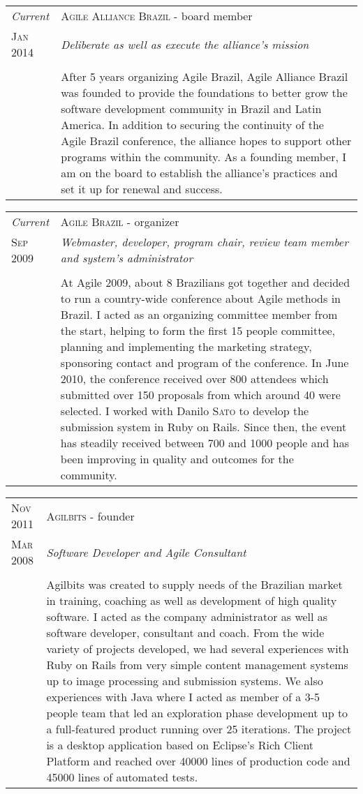 \documentclass[letter,10pt]{article}
\begin{document}
\begin{tabular}{p{2.5cm}|p{13.5cm}}
  \emph{Current} & \textsc{Agile Alliance Brazil} - board member\\
  \textsc{Jan 2014}& \emph{Deliberate as well as execute the alliance's mission}\\
  &\\
  & After 5 years organizing Agile Brazil, Agile Alliance Brazil
  was founded to provide the foundations to better grow the software
  development community in Brazil and Latin America. In addition to
  securing the continuity of the Agile Brazil conference, the alliance
  hopes to support other programs within the community. As a founding
  member, I am on the board to establish the alliance's practices
  and set it up for renewal and success.
\end{tabular}

\begin{tabular}{p{2.5cm}|p{13.5cm}}
  \emph{Current} & \textsc{Agile Brazil} - organizer\\
  \textsc{Sep 2009}& \emph{Webmaster, developer, program chair, review team
    member and system's administrator}\\
  &\\
  &At Agile 2009, about 8 Brazilians got together and
  decided to run a country-wide conference about Agile methods in
  Brazil. I acted as an organizing committee member from the start,
  helping to form the first 15 people committee, planning and implementing
  the marketing strategy, sponsoring contact and program of the conference.
  In June 2010, the conference received over 800 attendees which
  submitted over 150 proposals from which around 40 were selected. I
  worked with Danilo \textsc{Sato} to develop the submission system
  in Ruby on Rails. Since then, the event has steadily received between 700
  and 1000 people and has been improving in quality and outcomes for the
  community.
\end{tabular}

\begin{tabular}{p{2.5cm}|p{13.5cm}}
  \textsc{Nov 2011} & \textsc{Agilbits} - founder\\
  \textsc{Mar 2008}& \emph{Software Developer and Agile Consultant}\\
  &\\
  &Agilbits was created
  to supply needs of the Brazilian market in training, coaching as
  well as development of high quality software. I acted as the
  company administrator as well as software developer, consultant
  and coach.
  From the wide variety of projects developed, we had several
  experiences with Ruby on Rails from very simple content management
  systems up to image processing and submission systems.
  We also experiences with Java where I acted as member of a 3-5
  people team that led an exploration phase development up to a
  full-featured product running over 25 iterations. The project is a
  desktop application based on Eclipse's Rich Client Platform and
  reached over 40000 lines of production code and 45000 lines of
  automated tests.
\end{tabular}
\end{document}

